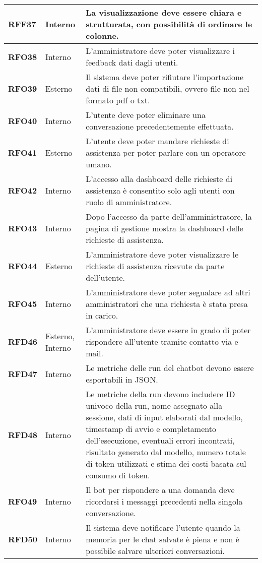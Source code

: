 \begin{longtable}{|>{\centering\arraybackslash}m{}|>{\centering\arraybackslash}m{}|>{\arraybackslash}m{}|}
	\hline
	\textbf{RFF37} & Interno 			& La visualizzazione deve essere chiara e strutturata, con possibilità di ordinare le colonne. \\
	\hline
	\textbf{RFO38} & Interno 			& L'amministratore deve poter visualizzare i feedback dati dagli utenti. \\
	\hline
	\textbf{RFO39} & Esterno 			& Il sistema deve poter rifiutare l'importazione dati di file non compatibili, ovvero file non nel formato pdf o txt. \\
	\hline
	\textbf{RFO40} & Interno 			& L'utente deve poter eliminare una conversazione precedentemente effettuata. \\
	\hline
	\textbf{RFO41} & Esterno 			& L'utente deve poter mandare richieste di assistenza per poter parlare con un operatore umano. \\
	\hline
	\textbf{RFO42} & Interno 			& L’accesso alla dashboard delle richieste di assistenza è consentito solo agli utenti con ruolo di amministratore. \\
	\hline
	\textbf{RFO43} & Interno 			& Dopo l’accesso da parte dell'amministratore, la pagina di gestione mostra la dashboard delle richieste di assistenza. \\
	\hline
	\textbf{RFO44} & Esterno 			& L'amministratore deve poter visualizzare le richieste di assistenza ricevute da parte dell'utente. \\
	\hline
	\textbf{RFO45} & Interno 			& L'amministratore deve poter segnalare ad altri amministratori che una richiesta è stata presa in carico. \\
	\hline
	\textbf{RFD46} & Esterno, Interno 	& L'amministratore deve essere in grado di poter rispondere all'utente tramite contatto via e-mail. \\
	\hline
	\textbf{RFD47} & Interno 			& Le metriche delle run del chatbot devono essere esportabili in JSON. \\
	\hline
	\textbf{RFD48} & Interno 			& Le metriche della run devono includere ID univoco della run, nome assegnato alla sessione, dati di input elaborati dal modello, timestamp di avvio e completamento dell'esecuzione, eventuali errori incontrati, risultato generato dal modello, numero totale di token utilizzati e stima dei costi basata sul consumo di token. \\
	\hline
	\textbf{RFO49} & Interno 			& Il bot per rispondere a una domanda deve ricordarsi i messaggi precedenti nella singola conversazione. \\
	\hline
	\textbf{RFD50} & Interno 			& Il sistema deve notificare l'utente quando la memoria per le chat salvate è piena e non è possibile salvare ulteriori conversazioni. \\

\end{longtable}
